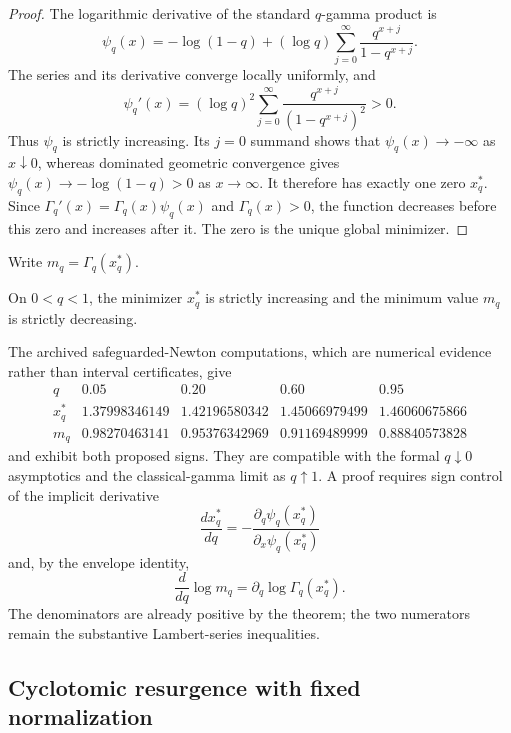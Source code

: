 \begin{proof}
The logarithmic derivative of the standard \(q\)-gamma product is
\[
 \psi_q(x)
 =-\log(1-q)+(\log q)
   \sum_{j=0}^{\infty}\frac{q^{x+j}}{1-q^{x+j}}.
\]
The series and its derivative converge locally uniformly, and
\[
 \psi_q'(x)
  =(\log q)^2
    \sum_{j=0}^{\infty}
      \frac{q^{x+j}}{(1-q^{x+j})^2}>0.
\]
Thus \(\psi_q\) is strictly increasing.  Its \(j=0\) summand shows that
\(\psi_q(x)\to-\infty\) as \(x\downarrow0\), whereas dominated geometric
convergence gives
\(\psi_q(x)\to-\log(1-q)>0\) as \(x\to\infty\).
It therefore has exactly one zero \(x_q^\ast\).  Since
\(\Gamma_q'(x)=\Gamma_q(x)\psi_q(x)\) and \(\Gamma_q(x)>0\),
the function decreases before this zero and increases after it.  The zero is
the unique global minimizer.
\end{proof}

Write \(m_q=\Gamma_q(x_q^\ast)\).

\begin{conjecture}
\label{conj:qgamma-monotone-minimizer}
On \(0<q<1\), the minimizer \(x_q^\ast\) is strictly increasing and the
minimum value \(m_q\) is strictly decreasing.
\end{conjecture}

The archived safeguarded-Newton computations, which are numerical evidence
rather than interval certificates, give
\[
\begin{array}{c|cccc}
q&0.05&0.20&0.60&0.95\\ \hline
x_q^\ast&1.37998346149&1.42196580342&1.45066979499&1.46060675866\\
m_q&0.98270463141&0.95376342969&0.91169489999&0.88840573828
\end{array}
\]
and exhibit both proposed signs.  They are compatible with the formal
\(q\downarrow0\) asymptotics and the classical-gamma limit as
\(q\uparrow1\).  A proof requires sign control of the implicit derivative
\[
 \frac{d x_q^\ast}{dq}
   =-\frac{\partial_q\psi_q(x_q^\ast)}
           {\partial_x\psi_q(x_q^\ast)}
\]
and, by the envelope identity,
\[
 \frac{d}{dq}\log m_q
   =\partial_q\log\Gamma_q(x_q^\ast).
\]
The denominators are already positive by the theorem; the two numerators
remain the substantive Lambert-series inequalities.

\subsection{Cyclotomic resurgence with fixed normalization}

